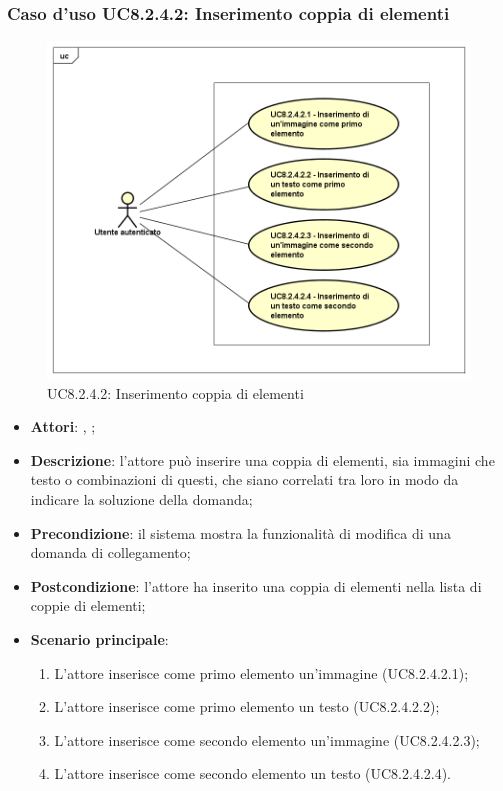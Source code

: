 	\subsubsection{Caso d'uso UC8.2.4.2: Inserimento coppia di elementi}
	\label{UC8.2.4.2}
	\begin{figure}[h]
		\centering
		\includegraphics[scale=0.5,keepaspectratio]{UML/UC8_2_4_2.png}
		\caption{UC8.2.4.2: Inserimento coppia di elementi}
	\end{figure}
	\FloatBarrier
	\begin{itemize}
		\item \textbf{Attori}: \uau, \uaupro;
		\item \textbf{Descrizione}: l'attore può inserire una coppia di elementi, sia immagini che testo o combinazioni di questi, che siano correlati tra loro in modo da indicare la soluzione della domanda; 
		\item \textbf{Precondizione}: il sistema mostra la funzionalità di modifica di una domanda di collegamento; 
		\item \textbf{Postcondizione}: l'attore ha inserito una coppia di elementi nella lista di coppie di elementi; 
		\item \textbf{Scenario principale}: 
		\begin{enumerate}
			\item L'attore inserisce come primo elemento un'immagine (UC8.2.4.2.1);
			\item L'attore inserisce come primo elemento un testo (UC8.2.4.2.2);
			\item L'attore inserisce come secondo elemento un'immagine (UC8.2.4.2.3);
			\item L'attore inserisce come secondo elemento un testo (UC8.2.4.2.4).	
		\end{enumerate}
	\end{itemize}
	
